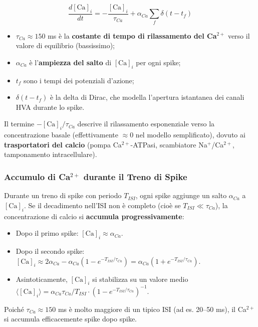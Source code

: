 \begin{equation}
\frac{d[\text{Ca}]_i}{dt} = -\frac{[\text{Ca}]_i}{\tau_{Ca}} + \alpha_{Ca} \sum_{f} \delta(t - t_f)
\end{equation}


\begin{itemize}
    \item $\tau_{Ca} \approx 150$ ms è la \textbf{costante di tempo di rilassamento del Ca$^{2+}$} verso il valore di equilibrio (bassissimo);
    \item $\alpha_{Ca}$ è l'\textbf{ampiezza del salto} di $[\text{Ca}]_i$ per ogni spike;
    \item $t_f$ sono i tempi dei potenziali d'azione;
    \item $\delta(t - t_f)$ è la delta di Dirac, che modella l'apertura istantanea dei canali HVA durante lo spike.
\end{itemize}

Il termine $-[\text{Ca}]_i / \tau_{Ca}$ descrive il rilassamento esponenziale verso la concentrazione basale (effettivamente $\approx 0$ nel modello semplificato), dovuto ai \textbf{trasportatori del calcio} (pompa Ca$^{2+}$-ATPasi, scambiatore Na$^+$/Ca$^{2+}$, tamponamento intracellulare).

\subsubsection{Accumulo di Ca$^{2+}$ durante il Treno di Spike}

Durante un treno di spike con periodo $T_{ISI}$, ogni spike aggiunge un salto $\alpha_{Ca}$ a $[\text{Ca}]_i$. Se il decadimento nell'ISI non è completo (cioè se $T_{ISI} \ll \tau_{Ca}$), la concentrazione di calcio si \textbf{accumula progressivamente}:

\begin{itemize}
    \item Dopo il primo spike: $[\text{Ca}]_i \approx \alpha_{Ca}$.
    \item Dopo il secondo spike: $[\text{Ca}]_i \approx 2\alpha_{Ca} - \alpha_{Ca}(1 - e^{-T_{ISI}/\tau_{Ca}}) = \alpha_{Ca}(1 + e^{-T_{ISI}/\tau_{Ca}})$.
    \item Asintoticamente, $[\text{Ca}]_i$ si stabilizza su un valore medio $\langle[\text{Ca}]_i\rangle = \alpha_{Ca} \tau_{Ca} / T_{ISI} \cdot (1 - e^{-T_{ISI}/\tau_{Ca}})^{-1}$.
\end{itemize}

Poiché $\tau_{Ca} \approx 150$ ms è molto maggiore di un tipico ISI (ad es. 20–50 ms), il Ca$^{2+}$ si accumula efficacemente spike dopo spike.

